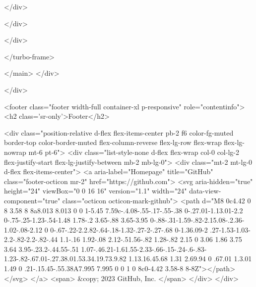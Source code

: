 </div>

  </div>


  </div>

</turbo-frame>


    </main>
  </div>

  </div>

          <footer class="footer width-full container-xl p-responsive" role="contentinfo">
  <h2 class='sr-only'>Footer</h2>

  <div class="position-relative d-flex flex-items-center pb-2 f6 color-fg-muted border-top color-border-muted flex-column-reverse flex-lg-row flex-wrap flex-lg-nowrap mt-6 pt-6">
    <div class="list-style-none d-flex flex-wrap col-0 col-lg-2 flex-justify-start flex-lg-justify-between mb-2 mb-lg-0">
      <div class="mt-2 mt-lg-0 d-flex flex-items-center">
        <a aria-label="Homepage" title="GitHub" class="footer-octicon mr-2" href="https://github.com">
          <svg aria-hidden="true" height="24" viewBox="0 0 16 16" version="1.1" width="24" data-view-component="true" class="octicon octicon-mark-github">
    <path d="M8 0c4.42 0 8 3.58 8 8a8.013 8.013 0 0 1-5.45 7.59c-.4.08-.55-.17-.55-.38 0-.27.01-1.13.01-2.2 0-.75-.25-1.23-.54-1.48 1.78-.2 3.65-.88 3.65-3.95 0-.88-.31-1.59-.82-2.15.08-.2.36-1.02-.08-2.12 0 0-.67-.22-2.2.82-.64-.18-1.32-.27-2-.27-.68 0-1.36.09-2 .27-1.53-1.03-2.2-.82-2.2-.82-.44 1.1-.16 1.92-.08 2.12-.51.56-.82 1.28-.82 2.15 0 3.06 1.86 3.75 3.64 3.95-.23.2-.44.55-.51 1.07-.46.21-1.61.55-2.33-.66-.15-.24-.6-.83-1.23-.82-.67.01-.27.38.01.53.34.19.73.9.82 1.13.16.45.68 1.31 2.69.94 0 .67.01 1.3.01 1.49 0 .21-.15.45-.55.38A7.995 7.995 0 0 1 0 8c0-4.42 3.58-8 8-8Z"></path>
</svg>
</a>        <span>
        &copy; 2023 GitHub, Inc.
        </span>
      </div>
    </div>

